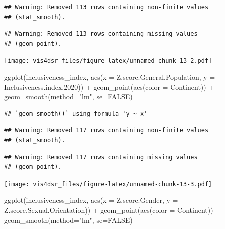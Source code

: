 \documentclass[
]{krantz}
\makeatletter
\newenvironment{Shaded}{\begin{snugshade}}{\end{snugshade}}
\newcommand{\AttributeTok}[1]{\textcolor[rgb]{0.61,0.61,0.61}{#1}}
\newcommand{\ConstantTok}[1]{\textcolor[rgb]{0,0,0}{#1}}
\newcommand{\FloatTok}[1]{\textcolor[rgb]{0.06,0.06,0.06}{#1}}
\newcommand{\FunctionTok}[1]{\textcolor[rgb]{0,0,0}{#1}}
\newcommand{\NormalTok}[1]{#1}
\newcommand{\SpecialCharTok}[1]{\textcolor[rgb]{0,0,0}{#1}}
\newcommand{\StringTok}[1]{\textcolor[rgb]{0.5,0.5,0.5}{#1}}
\newenvironment{kframe}{%
\medskip{}
\setlength{\fboxsep}{.8em}
 \def\at@end@of@kframe{}%
 \ifinner\ifhmode%
  \def\at@end@of@kframe{\end{minipage}}%
  \begin{minipage}{\columnwidth}%
 \fi\fi%
 \def\FrameCommand##1{\hskip\@totalleftmargin \hskip-\fboxsep
 \colorbox{shadecolor}{##1}\hskip-\fboxsep
     \hskip-\linewidth \hskip-\@totalleftmargin \hskip\columnwidth}%
 \MakeFramed {\advance\hsize-\width
   \@totalleftmargin\z@ \linewidth\hsize
   \@setminipage}}%
 {\par\unskip\endMakeFramed%
 \at@end@of@kframe}
\renewenvironment{Shaded}{\begin{kframe}}{\end{kframe}}
\makeatother
\begin{document}
\begin{verbatim}
## Warning: Removed 113 rows containing non-finite values
## (stat_smooth).
\end{verbatim}

\begin{verbatim}
## Warning: Removed 113 rows containing missing values
## (geom_point).
\end{verbatim}

\texttt{[image: vis4dsr\_files/figure-latex/unnamed-chunk-13-2.pdf]}

\begin{Shaded}
\begin{Highlighting}[]
\FunctionTok{ggplot}\NormalTok{(inclusiveness\_index, }
       \FunctionTok{aes}\NormalTok{(}\AttributeTok{x =}\NormalTok{ Z.score.General.Population, }
           \AttributeTok{y =}\NormalTok{ Inclusiveness.index}\FloatTok{.2020}\NormalTok{)) }\SpecialCharTok{+}
  \FunctionTok{geom\_point}\NormalTok{(}\FunctionTok{aes}\NormalTok{(}\AttributeTok{color =}\NormalTok{ Continent)) }\SpecialCharTok{+}
  \FunctionTok{geom\_smooth}\NormalTok{(}\AttributeTok{method=}\StringTok{"lm"}\NormalTok{, }\AttributeTok{se=}\ConstantTok{FALSE}\NormalTok{)}
\end{Highlighting}
\end{Shaded}

\begin{verbatim}
## `geom_smooth()` using formula 'y ~ x'
\end{verbatim}

\begin{verbatim}
## Warning: Removed 117 rows containing non-finite values
## (stat_smooth).
\end{verbatim}

\begin{verbatim}
## Warning: Removed 117 rows containing missing values
## (geom_point).
\end{verbatim}

\texttt{[image: vis4dsr\_files/figure-latex/unnamed-chunk-13-3.pdf]}

\begin{Shaded}
\begin{Highlighting}[]
\FunctionTok{ggplot}\NormalTok{(inclusiveness\_index, }
       \FunctionTok{aes}\NormalTok{(}\AttributeTok{x =}\NormalTok{ Z.score.Gender, }
           \AttributeTok{y =}\NormalTok{ Z.score.Sexual.Orientation)) }\SpecialCharTok{+}
  \FunctionTok{geom\_point}\NormalTok{(}\FunctionTok{aes}\NormalTok{(}\AttributeTok{color =}\NormalTok{ Continent)) }\SpecialCharTok{+}
  \FunctionTok{geom\_smooth}\NormalTok{(}\AttributeTok{method=}\StringTok{"lm"}\NormalTok{, }\AttributeTok{se=}\ConstantTok{FALSE}\NormalTok{)}
\end{Highlighting}
\end{Shaded}
\end{document}
